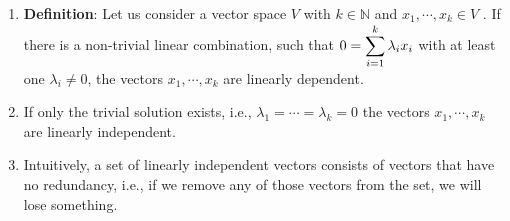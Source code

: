 \begin{enumerate}
    \item \textbf{Definition}: Let us consider a vector space $V$ with $k \in \mathbb{N}$ and $x_1, \cdots , x_k \in V$ . If there is a non-trivial linear combination, such that $0 = \displaystyle\sum ^k _{i=1} \lambda_i x_i$ with at least one $\lambda _i \neq 0$, the vectors  $x_1, \cdots , x_k$ are linearly dependent. 
    \hfill \cite{mfml/book/mml/Deisenroth-Faisal-Ong}
    
    \item If only the trivial solution exists, i.e., $\lambda _1 = \cdots = \lambda _k = 0$ the vectors $x_1, \cdots , x_k$ are linearly independent.
    \hfill \cite{mfml/book/mml/Deisenroth-Faisal-Ong}

    \item Intuitively, a set of linearly independent vectors consists of vectors that have no redundancy, i.e., if we remove any of those vectors from the set, we will lose something.
    \hfill \cite{mfml/book/mml/Deisenroth-Faisal-Ong}
\end{enumerate}


